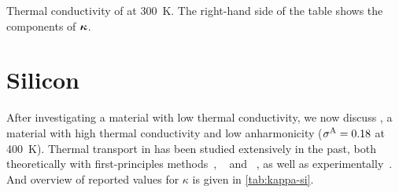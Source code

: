 \begin{table*}
    \caption{Thermal conductivity of  at \qty{300}{K}. The right-hand side of the table shows the components of $\boldsymbol{\kappa}$.}
    
    \label{tab:gko_snse_kappa}
\end{table*}

\section{Silicon}
\label{sec:gk-si}








After investigating a material with low thermal conductivity, we now discuss , a material with high thermal conductivity and low anharmonicity ($\sigma^{\text{A}} = 0.18$ at \qty{400}{K}). Thermal transport in  has been studied extensively in the past, both theoretically with first-principles methods~\cite{bmms2007t,crs2017t,pnnc2017t}, \ffs~\cite{hsdg2012t,h2012t,dfha2018t,fpdh2015t,crs2017t} and \mlps~\cite{qpwy2019q,lll2020q}, as well as experimentally~\cite{smsd1963t,gs1964t,fmgm1968t,hpl1972t,rhds2000t,rhds2003t,kgtp2004t}. And overview of reported values for $\kappa$ is given in \cref{tab:kappa-si}.


